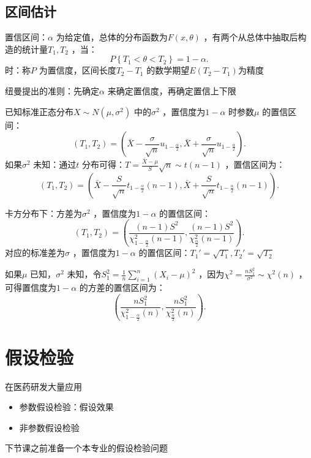 \subsection{区间估计}%
\label{sub:区间估计}
\begin{defi}
    置信区间：$\alpha$ 为给定值，总体的分布函数为$F\left( x,\theta \right)$ ，有两个从总体中抽取后构造的统计量$T_1,T_2$ ，当：\[
        P\left\{ T_1<\theta<T_2 \right\}=1-\alpha
    .\]
    时：称$P$ 为置信度，区间长度$T_2-T_1$ 的数学期望$E\left( T_2-T_1 \right)$为精度
\end{defi}
纽曼提出的准则：先确定$\alpha$ 来确定置信度，再确定置信上下限
\begin{notation}
    已知标准正态分布$X\sim N\left( \mu,\sigma^2  \right)$ 中的$\sigma^2 $ ，置信度为$1-\alpha$ 时参数$\mu$ 的置信区间：\[
        \left( T_1,T_2 \right)=\left( \bar{X}-\frac{\sigma}{\sqrt{n}}u_{1-\frac{\alpha}{2}},\bar{X}+\frac{\sigma}{\sqrt{n}}u_{1-\frac{\alpha}{2}} \right)
    .\]
    如果$\sigma^2 $ 未知：通过$t$ 分布可得：$T=\frac{\bar{X}-\mu}{S}\sqrt{n}\sim t\left( n-1 \right)$ ，置信区间为：\[
        \left( T_1,T_2 \right)=\left( \bar{X}-\frac{S}{\sqrt{n}}t_{1-\frac{\alpha}{2}}\left( n-1 \right),\bar{X}+\frac{S}{\sqrt{n}}t_{1-\frac{\alpha}{2}}\left( n-1 \right) \right)
    .\]
\end{notation}
\begin{notation}
卡方分布下：方差为$\sigma^2 $ ，置信度为$1-\alpha$ 的置信区间：\[
    \left( T_1,T_2 \right)=\left( \frac{\left( n-1 \right)S^2 }{\chi^2 _{1-\frac{\alpha}{2}}\left( n-1 \right)},\frac{\left( n-1 \right)S^2 }{\chi^2 _{\frac{\alpha}{2}}\left( n-1 \right)} \right)
.\]
对应的标准差为$\sigma$ ，置信度为$1-\alpha$ 的置信区间：$T_1'=\sqrt{T_1},T_2'=\sqrt{T_2}$

如果$\mu$ 已知，$\sigma^2 $ 未知，令$S_1^2 =\frac{1}{n}\sum_{i=1}^{n} \left( X_{i}-\mu \right)^2 $ ，因为$\chi^2 =\frac{nS_1^2 }{\sigma^2 }\sim \chi^2 \left( n \right)$ ，可得置信度为$1-\alpha$ 的方差的置信区间为：\[
    \left( \frac{nS_1^2 }{\chi^2 _{1-\frac{\alpha}{2}}\left( n \right)},\frac{nS_1^2 }{\chi^2 _{\frac{\alpha}{2}}\left( n \right)} \right)
.\] 
\end{notation}
\section{假设检验}%
\label{sec:假设检验}
\begin{notation}
    在医药研发大量应用
\end{notation}
\begin{itemize}
    \item 参数假设检验：假设效果
    \item 非参数假设检验
\end{itemize}
\begin{notation}
    下节课之前准备一个本专业的假设检验问题
\end{notation}

